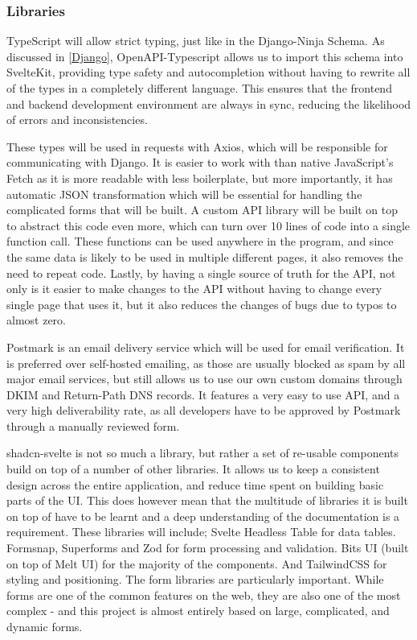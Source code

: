 \subsubsection{Libraries}
TypeScript will allow strict typing, just like in the Django-Ninja Schema. As discussed in \ref{Django}, OpenAPI-Typescript allows us to import this schema into SvelteKit, providing type safety and autocompletion without having to rewrite all of the types in a completely different language. This ensures that the frontend and backend development environment are always in sync, reducing the likelihood of errors and inconsistencies. 

These types will be used in requests with Axios, which will be responsible for communicating with Django. It is easier to work with than native JavaScript's Fetch as it is more readable with less boilerplate, but more importantly, it has automatic JSON transformation which will be essential for handling the complicated forms that will be built. A custom API library will be built on top to abstract this code even more, which can turn over 10 lines of code into a single function call. These functions can be used anywhere in the program, and since the same data is likely to be used in multiple different pages, it also removes the need to repeat code. Lastly, by having a single source of truth for the API, not only is it easier to make changes to the API without having to change every single page that uses it, but it also reduces the changes of bugs due to typos to almost zero.

Postmark is an email delivery service which will be used for email verification. It is preferred over self-hosted emailing, as those are usually blocked as spam by all major email services, but still allows us to use our own custom domains through DKIM and Return-Path DNS records. It features a very easy to use API, and a very high deliverability rate, as all developers have to be approved by Postmark through a manually reviewed form.

shadcn-svelte is not so much a library, but rather a set of re-usable components build on top of a number of other libraries. It allows us to keep a consistent design across the entire application, and reduce time spent on building basic parts of the UI. This does however mean that the multitude of libraries it is built on top of have to be learnt and a deep understanding of the documentation is a requirement. These libraries will include; Svelte Headless Table for data tables. Formsnap, Superforms and Zod for form processing and validation. Bits UI (built on top of Melt UI) for the majority of the components. And TailwindCSS for styling and positioning. The form libraries are particularly important. While forms are one of the common features on the web, they are also one of the most complex - and this project is almost entirely based on large, complicated, and dynamic forms.

